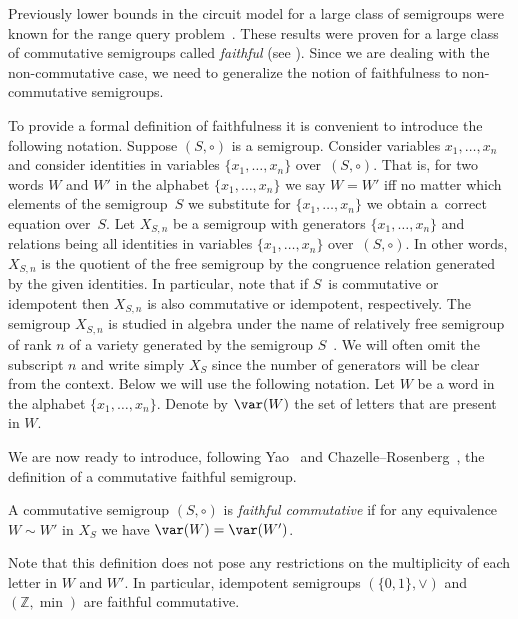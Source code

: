 \documentclass{toc}
\begin{document}
Previously lower bounds in the circuit model for a large class of semigroups
were known for
%
%
the range query
problem~\cite{DBLP:conf/stoc/Yao82,DBLP:journals/ijcga/ChazelleR91}. These
results were proven for a large class of commutative semigroups called
\emph{faithful} (see ). Since we are dealing
with the non-commutative case, we need to generalize the notion of faithfulness
to non-commutative semigroups.

To provide a formal definition of faithfulness it is convenient to introduce the
following notation. Suppose $(S, \circ)$ is a
semigroup.  %
%
%
%
%
%
%
%
%
%
Consider variables $x_1,\ldots, x_n$ and consider identities in variables $\{x_1,\ldots, x_n\}$ over~$(S,\circ)$.
That is, for two words $W$ and $W'$ in
the alphabet $\{x_1,\ldots,x_n\}$ we say $W = W'$ iff no matter
which elements of the semigroup~$S$ we substitute for $\{x_1,\ldots, x_n\}$ we
obtain a~correct equation over~$S$.
Let $X_{S,n}$ be a semigroup with generators $\{x_1,\ldots, x_n\}$
and relations being all identities in variables $\{x_1,\ldots, x_n\}$ over~$(S,\circ)$.
%
In  %
other words, $X_{S,n}$ is the quotient of the free semigroup by the congruence relation generated by the given identities.
%
In particular, note that if $S$~is
%
%
commutative or idempotent then $X_{S,n}$ is also commutative or idempotent,
respectively.  %
The semigroup $X_{S,n}$ is studied in algebra under the name of relatively free
semigroup of rank $n$ of a variety generated by
the   %
semigroup
$S$~\cite{neumann2012varieties}. %
%
We will often omit the subscript $n$ and write
simply $X_S$ since the number of generators will be clear from the context.
Below we will use the following notation. Let $W$ be a word in the alphabet
$\{x_1,\ldots, x_n\}$. Denote by $\var(W)$ the set of letters that are present
in $W$.

We are now ready to introduce,
%
following Yao~\cite{DBLP:conf/stoc/Yao82} and
Chazelle--Rosenberg~\cite{DBLP:journals/ijcga/ChazelleR91},  %
the definition of a commutative faithful semigroup.

\begin{definition}  %
%
%
%
\label{def:faithfulcommutative}
A commutative semigroup $(S, \circ)$ is \emph{faithful commutative} if for any
equivalence $W\sim W'$ in $X_S$ we have $\var(W)=\var(W')$.
\end{definition}


Note that this definition does not pose any restrictions on the
%
%
multiplicity
of
each letter %
%
%
in $W$ and $W'$. In particular, %
%
%
idempotent semigroups
$(\{0,1\}, \vee)$ and $(\mathbb{Z},\min)$ are faithful commutative. %
%
%
%
\end{document}
